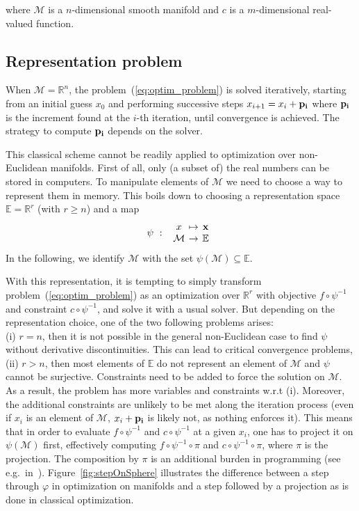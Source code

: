 where $\mathcal{M}$ is a $n$-dimensional smooth manifold and $c$ is a $m$-dimensional real-valued function.

\subsection{Representation problem}
When $\mathcal{M} = \mathbb{R}^n$, the problem~(\ref{eq:optim_problem}) is solved iteratively, starting from an initial guess $x_0$ and performing successive steps $x_{i+1} = x_i + {\bf p_i}$ where ${\bf p_i}$ is the increment found at the $i$-th iteration, until convergence is achieved.
The strategy to compute ${\bf p_i}$ depends on the solver.

This classical scheme cannot be readily applied to optimization over non-Euclidean manifolds.
First of all, only (a subset of) the real numbers can be stored in computers.
To manipulate elements of $\mathcal{M}$ we need to choose a way to represent them in memory.
This boils down to choosing a representation space $\mathbb{E} = \mathbb{R}^r$ (with $r \geq n$) and a map
\begin{equation}
  \psi\ :\
  \begin{array}{ccc}
    x & \reduce{\mapsto}{6} & \mathbf{x} \\
    \mathcal{M} & \reduce{\rightarrow}{6} & \mathbb{E}
  \end{array} \nonumber
\end{equation}
In the following, we identify $\mathcal{M}$ with the set $\psi(\mathcal{M}) \subseteq \mathbb{E}$.

With this representation, it is tempting to simply transform problem~(\ref{eq:optim_problem}) as an optimization over $\mathbb{R}^r$ with objective $f \circ \psi^{-1}$ and constraint $c \circ \psi^{-1}$, and solve it with a usual solver.
But depending on the representation choice, one of the two following problems arises:\\
(i) $r=n$, then it is not possible in the general non-Euclidean case to find $\psi$ without derivative discontinuities.
This can lead to critical convergence problems, \\
(ii) $r>n$, then most elements of $\mathbb{E}$ do not represent an element of $\mathcal{M}$ %
and $\psi$ cannot be surjective.
Constraints need to be added to force the solution on $\mathcal{M}$.
As a result, the problem has more variables and constraints w.r.t (i).
Moreover, the additional constraints are unlikely to be met along the iteration process (even if $x_i$ is an element of $\mathcal{M}$, $x_i+{\bf p_i}$ is likely not, as nothing enforces it).
This means that in order to evaluate $f \circ \psi^{-1}$ and $c \circ \psi^{-1}$ at a given $x_i$, one has to project it on $\psi(\mathcal{M})$ first, effectively computing $f \circ \psi^{-1} \circ \pi$ and $c \circ \psi^{-1} \circ \pi$, where $\pi$ is the projection.
The composition by $\pi$ is an additional burden in programming (see e.g.\ in~\cite{bouyarmane:humanoids:2012a}).
Figure~\ref{fig:stepOnSphere} illustrates the difference between a step through $\varphi$ in optimization on manifolds and a step followed by a projection as is done in classical optimization.

